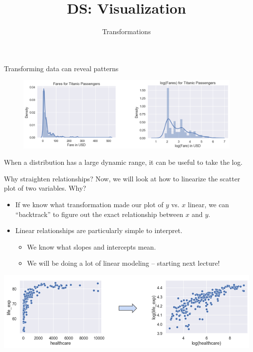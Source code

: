 \documentclass[aspectratio=169]{../latex_main/tntbeamer}  %
\title[Visualization]{DS: Visualization}
\subtitle{Transformations}
\begin{document}
	
	\maketitle
	\begin{frame}{Transforming data can reveal patterns}
	    \begin{figure}
	        \centering
	        \includegraphics[scale=.43]{Bild94}
	    \end{figure}
	    When a distribution has a large dynamic range, it can be useful to take the log.
	\end{frame}
	
	
	\begin{frame}{Why straighten relationships?}
	   Now, we will look at how to linearize the scatter plot of two variables. Why?
	   \begin{itemize}
	       \item If we know what transformation made our plot of $y$ vs. $x$ linear, we can “backtrack” to figure out the exact relationship between $x$ and $y$.
	       \item Linear relationships are particularly simple to interpret.
	       \begin{itemize}
	           \item We know what slopes and intercepts mean.
	           \item We will be doing a lot of linear modeling – starting next lecture!
	       \end{itemize}
	   \end{itemize}
	        \includegraphics[scale=.43]{Bild95}
	\end{frame}
	
	
	
\end{document}
